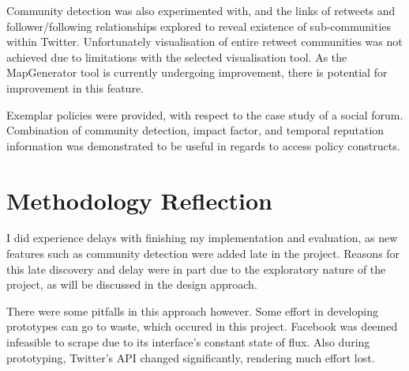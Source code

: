 Community detection was also experimented with, and the links of retweets and follower/following relationships explored to reveal existence of sub-communities within Twitter. Unfortunately visualisation of entire retweet communities was not achieved due to limitations with the selected visualisation tool. As the MapGenerator tool is currently undergoing improvement, there is potential for improvement in this feature.

Exemplar policies were provided, with respect to the case study of a social forum. Combination of community detection, impact factor, and temporal reputation information was demonstrated to be useful in regards to access policy constructs. 

\section{Methodology Reflection}

 I did experience delays with finishing my implementation and evaluation, as new features such as community detection were added late in the project. Reasons for this late discovery and delay were in part due to the exploratory nature of the project, as will be discussed in the design approach.
 
 There were some pitfalls in this approach however. Some effort in developing prototypes can go to waste, which occured in this project. Facebook was deemed infeasible to scrape due to its interface's constant state of flux. Also during prototyping, Twitter's API changed significantly, rendering much effort lost.





